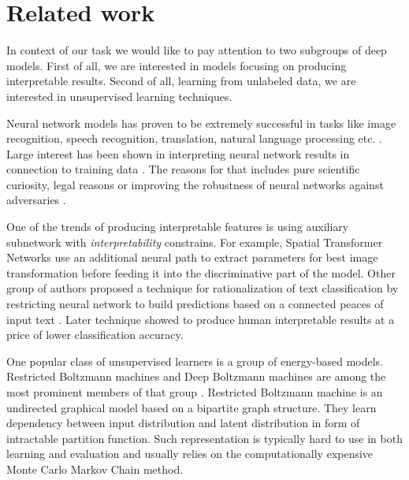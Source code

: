 
\chapter{Related work}\label{ch:rewo}

In context of our task we would like to pay attention to two subgroups of deep models.
First of all, we are interested in models focusing on producing interpretable results.
Second of all, learning from unlabeled data, we are interested in unsupervised learning techniques.

Neural network models has proven to be extremely successful in tasks like image recognition, speech recognition, translation, natural language processing etc. \cite{}.
Large interest has been shown in interpreting neural network results in connection to training data \cite{Yosinski2015, Mahendran2014, Zeiler2014, Lei2016}.
The reasons for that includes pure scientific curiosity, legal reasons or improving the robustness of neural networks against adversaries \cite{Goodfellow2015}.

One of the trends of producing interpretable features is using auxiliary subnetwork with \textit{interpretability} constrains.
For example, Spatial Transformer Networks \cite{Jaderberg2015} use an additional neural path to extract parameters for best image transformation before feeding it into the discriminative part of the model.
Other group of authors proposed a technique for rationalization of text classification by restricting neural network to build predictions based on a connected peaces of input text \cite{Lei2016}.
Later technique showed to produce human interpretable results at a price of lower classification accuracy.

One popular class of unsupervised learners is a group of energy-based models.
Restricted Boltzmann machines and Deep Boltzmann machines are among the most prominent members of that group \cite{Ackley1985, Salakhutdinov2009}.
Restricted Boltzmann machine is an undirected graphical model based on a bipartite graph structure.
They learn dependency between input distribution and latent distribution in form of intractable partition function.
Such representation is typically hard to use in both learning and evaluation and usually relies on the computationally expensive Monte Carlo Markov Chain method.

